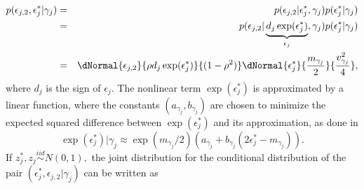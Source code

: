 \begin{eqnarray*}
	p( \epsilon_{j,2}, \epsilon_{j}^* | \gamma_j ) &=& p( \epsilon_{j,2} | \epsilon_{j}^*, \gamma_j ) p( \epsilon_{j}^* | \gamma_j) \\
	&=& p( \epsilon_{j,2} | \underbrace{ d_j \exp( \epsilon_{j}^* ) }_{\epsilon_{j}}, \gamma_j ) p( \epsilon_{j}^* | \gamma_j) \\
	&=& \dNormal{\epsilon_{j,2}}{\rho d_j \exp( \epsilon_{j}^* )}{(1-\rho^2) } \dNormal{\epsilon_{j}^*}{ \frac{m_{\gamma_j}}{2} }{ \frac{v_{\gamma_j}^2}{4} },
\end{eqnarray*}
where $d_j$ is the sign of $\epsilon_{j}$. The nonlinear term $\exp( \epsilon_{j}^* )$ is approximated by a linear function, where the constants $(a_{\gamma_j}, b_{\gamma_j})$ are chosen to minimize the expected squared difference between $\exp(\epsilon_{j}^*)$ and its approximation, as done in \cite{omori2007stochastic}
\[
\exp( \epsilon_{j}^* ) | \gamma_j \approx \exp(m_{\gamma_j} /2) (a_{\gamma_j} + b_{\gamma_j}( 2\epsilon_{j}^* - m_{\gamma_j} ) ).
\]
If $z_{j}^*, z_{j} \stackrel{iid}{\sim} N(0,1),$ the joint distribution for the conditional distribution of the pair $(\epsilon_{j}^*, \epsilon_{j,2} | \gamma_j)$ can be written as


